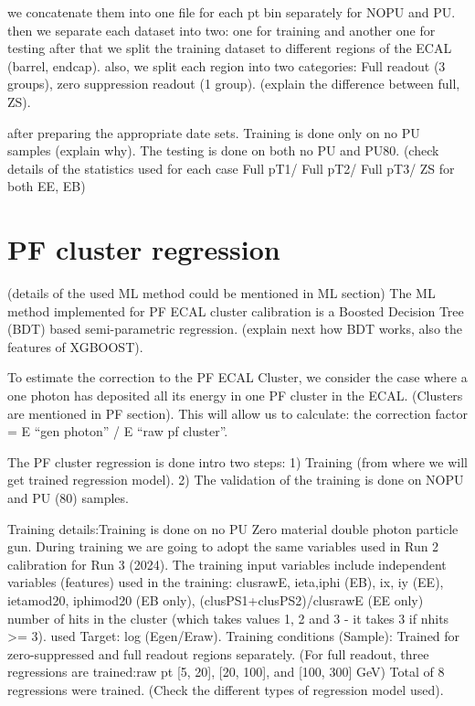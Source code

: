 we concatenate them into one file for each pt bin separately for NOPU and PU.  
then we separate each dataset into two: one for training and another one for testing  
after that we split the training dataset to different regions of the ECAL (barrel, endcap).  
also, we split each region into two categories: Full readout (3 groups), zero suppression readout (1 group). (explain the difference between full, ZS).

after preparing the appropriate date sets. Training is done only on no PU samples (explain why). The testing is done on both no PU and PU80. (check details of the statistics used for each case Full pT1/ Full pT2/ Full pT3/ ZS for both EE, EB) 

\section{PF cluster regression}

(details of the used ML method could be mentioned in ML section) The ML method implemented for PF ECAL cluster calibration is a Boosted Decision Tree (BDT) based semi-parametric regression. (explain next how BDT works, also the features of XGBOOST).

To estimate the correction to the PF ECAL Cluster, we consider the case where a one photon has deposited all its energy in one PF cluster in the ECAL. (Clusters are mentioned in PF section). This will allow us to calculate: the correction factor = E “gen photon” / E “raw pf cluster”.

The PF cluster regression is done intro two steps:  
1) Training (from where we will get trained regression model). 
2) The validation of the training is done on NOPU and PU (80) samples.

Training details:Training is done on no PU Zero material double photon particle gun. During training we are going to adopt the same variables used in Run 2 calibration for Run 3 (2024). 
The training input variables include independent variables (features) used in the training:  clusrawE, ieta,iphi (EB), ix, iy (EE), ietamod20, iphimod20 (EB only), (clusPS1+clusPS2)/clusrawE (EE only) number of hits in the cluster (which takes values 1, 2 and 3 - it takes 3 if nhits >= 3). used Target: log (Egen/Eraw). 
Training conditions (Sample): Trained for zero-suppressed and full readout regions separately. (For full readout, three regressions are trained:raw pt [5, 20], [20, 100], and [100, 300] GeV) 
Total of 8 regressions were trained. (Check the different types of regression model used).

